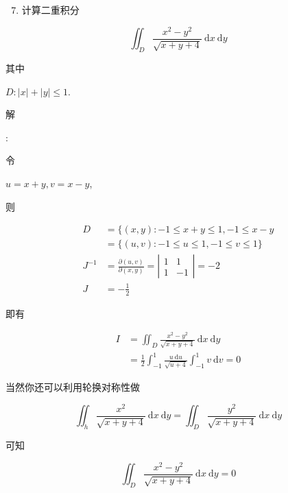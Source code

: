 \documentclass[10pt]{article}
\begin{document}
\begin{enumerate}
  \setcounter{enumi}{6}
  \item \begin{CJK}{UTF8}{mj}计算二重积分\end{CJK}
\end{enumerate}
$$
\iint_{D} \frac{x^{2}-y^{2}}{\sqrt{x+y+4}} \mathrm{~d} x \mathrm{~d} y
$$
\begin{CJK}{UTF8}{mj}其中\end{CJK} $D:|x|+|y| \leq 1$.

\begin{CJK}{UTF8}{mj}解\end{CJK}: \begin{CJK}{UTF8}{mj}令\end{CJK} $u=x+y, v=x-y$, \begin{CJK}{UTF8}{mj}则\end{CJK}
$$
\begin{aligned}
D &=\{(x, y):-1 \leqslant x+y \leqslant 1,-1 \leqslant x-y\\
&=\{(u, v):-1 \leqslant u \leqslant 1,-1 \leqslant v \leqslant 1\} \\
J^{-1} &=\frac{\partial(u, v)}{\partial(x, y)}=\left|\begin{array}{cc}
1 & 1 \\
1 & -1
\end{array}\right|=-2 \\
J &=-\frac{1}{2}
\end{aligned}
$$
\begin{CJK}{UTF8}{mj}即有\end{CJK}
$$
\begin{aligned}
I &=\iint_{D} \frac{x^{2}-y^{2}}{\sqrt{x+y+4}} \mathrm{~d} x \mathrm{~d} y \\
&=\frac{1}{2} \int_{-1}^{1} \frac{u \mathrm{~d} u}{\sqrt{u+4}} \int_{-1}^{1} v \mathrm{~d} v=0
\end{aligned}
$$
\begin{CJK}{UTF8}{mj}当然你还可以利用轮换对称性做\end{CJK}
$$
\iint_{h} \frac{x^{2}}{\sqrt{x+y+4}} \mathrm{~d} x \mathrm{~d} y=\iint_{D} \frac{y^{2}}{\sqrt{x+y+4}} \mathrm{~d} x \mathrm{~d} y
$$
\begin{CJK}{UTF8}{mj}可知\end{CJK}
$$
\iint_{D} \frac{x^{2}-y^{2}}{\sqrt{x+y+4}} \mathrm{~d} x \mathrm{~d} y=0
$$
\end{document}
